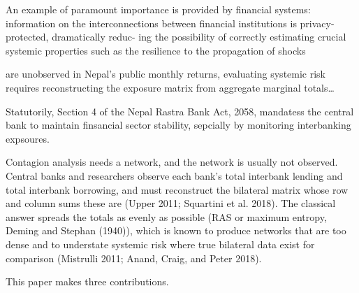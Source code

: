 \documentclass[
  a4paper,
]{article}
\begin{document}
An example of paramount importance is provided by financial systems:
information on the interconnections between financial institutions is
privacy-protected, dramatically reduc- ing the possibility of correctly
estimating crucial systemic properties such as the resilience to the
propagation of shocks

are unobserved in Nepal's public monthly returns, evaluating systemic
risk requires reconstructing the exposure matrix from aggregate marginal
totals\ldots{}

Statutorily, Section 4 of the Nepal Rastra Bank Act, 2058, mandatess the
central bank to maintain finsancial sector stability, sepcially by
monitoring interbanking expsoures.

Contagion analysis needs a network, and the network is usually not
observed. Central banks and researchers observe each bank's total
interbank lending and total interbank borrowing, and must reconstruct
the bilateral matrix whose row and column sums these are (Upper 2011;
Squartini et al. 2018). The classical answer spreads the totals as
evenly as possible (RAS or maximum entropy, Deming and Stephan (1940)),
which is known to produce networks that are too dense and to understate
systemic risk where true bilateral data exist for comparison (Mistrulli
2011; Anand, Craig, and Peter 2018).

This paper makes three contributions.
\end{document}
